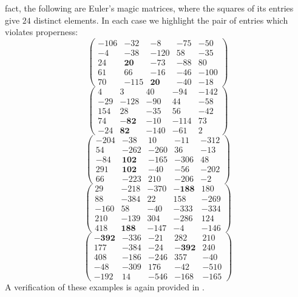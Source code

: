 \documentclass[12pt]{amsart}
\theoremstyle{definition}
\begin{document}
fact, the following are Euler's magic matrices, where the squares of
its entries give $24$ distinct elements. In each case we highlight the
pair of entries which violates properness:
\[
  \left(\begin{array}{rrrrr}
    -106 & -32 & -8 & -75 & -50 \\
    -4 & -38 & -120 & 58 & -35 \\
    24 & \mathbf{20} & -73 & -88 & 80 \\
    61 & 66 & -16 & -46 & -100 \\
    70 & -115 & \mathbf{20} & -40 & -18
  \end{array}\right)
\]
\[
  \left(\begin{array}{rrrrr}
4 & 3 & 40 & -94 & -142 \\
-29 & -128 & -90 & 44 & -58 \\
154 & 28 & -35 & 56 & -42 \\
74 & \mathbf{-82} & -10 & -114 & 73 \\
-24 & \mathbf{82} & -140 & -61 & 2
  \end{array}\right)
\]
\[
  \left(\begin{array}{rrrrr}
    -204 & -38 & 10 & -11 & -312 \\
    54 & -262 & -260 & 36 & -13 \\
    -84 & \mathbf{102} & -165 & -306 & 48 \\
    291 & \mathbf{102} & -40 & -56 & -202 \\
    66 & -223 & 210 & -206 & -2
  \end{array}\right)
\]
\[
  \left(\begin{array}{rrrrr}
    29 & -218 & -370 & \mathbf{-188} & 180 \\
    88 & -384 & 22 & 158 & -269 \\
    -160 & 58 & -40 & -333 & -334 \\
    210 & -139 & 304 & -286 & 124 \\
    418 & \mathbf{188} & -147 & -4 & -146
  \end{array}\right)
\]
\[
  \left(\begin{array}{rrrrr}
    \mathbf{-392} & -336 & -21 & 282 & 210 \\
    177 & -384 & -24 & \mathbf{-392} & 240 \\
    408 & -186 & -246 & 357 & -40 \\
    -48 & -309 & 176 & -42 & -510 \\
    -192 & 14 & -546 & -168 & -165
  \end{array}\right)
\]
A verification of these examples is again provided in \cite{euler_verify}.
\end{document}
